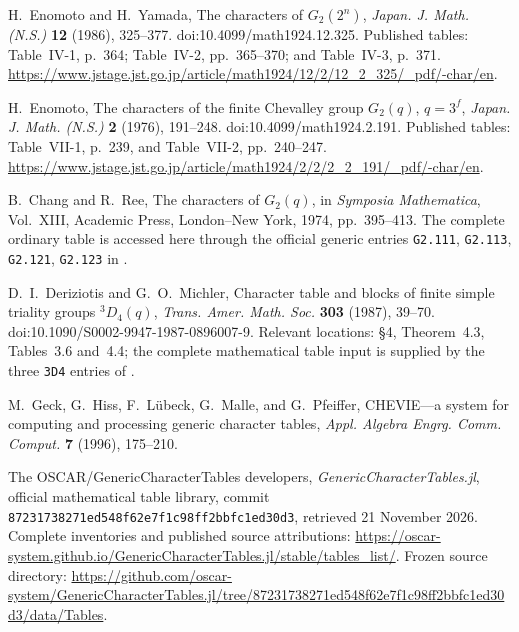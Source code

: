 H.~Enomoto and H.~Yamada,
The characters of $G_2(2^n)$,
\emph{Japan. J. Math. (N.S.)} \textbf{12} (1986), 325--377.
doi:10.4099/math1924.12.325.
Published tables: Table~IV-1, p.~364; Table~IV-2, pp.~365--370;
and Table~IV-3, p.~371.
\url{https://www.jstage.jst.go.jp/article/math1924/12/2/12_2_325/_pdf/-char/en}.

H.~Enomoto,
The characters of the finite Chevalley group $G_2(q)$, $q=3^f$,
\emph{Japan. J. Math. (N.S.)} \textbf{2} (1976), 191--248.
doi:10.4099/math1924.2.191.
Published tables: Table~VII-1, p.~239, and Table~VII-2, pp.~240--247.
\url{https://www.jstage.jst.go.jp/article/math1924/2/2/2_2_191/_pdf/-char/en}.

B.~Chang and R.~Ree,
The characters of $G_2(q)$,
in \emph{Symposia Mathematica}, Vol.~XIII,
Academic Press, London--New York, 1974, pp.~395--413.
The complete ordinary table is accessed here through the official
generic entries \texttt{G2.111}, \texttt{G2.113},
\texttt{G2.121}, \texttt{G2.123} in \cite{G2T:GCT}.

D.~I.~Deriziotis and G.~O.~Michler,
Character table and blocks of finite simple triality groups ${}^3D_4(q)$,
\emph{Trans. Amer. Math. Soc.} \textbf{303} (1987), 39--70.
doi:10.1090/S0002-9947-1987-0896007-9.
Relevant locations: \S4, Theorem~4.3, Tables~3.6 and~4.4;
the complete mathematical table input is supplied by the three
\texttt{3D4} entries of \cite{G2T:GCT}.

M.~Geck, G.~Hiss, F.~L\"ubeck, G.~Malle, and G.~Pfeiffer,
CHEVIE---a system for computing and processing generic character tables,
\emph{Appl. Algebra Engrg. Comm. Comput.} \textbf{7} (1996), 175--210.

The OSCAR/GenericCharacterTables developers,
\emph{GenericCharacterTables.jl}, official mathematical table library,
commit \texttt{87231738271ed548f62e7f1c98ff2bbfc1ed30d3},
retrieved 21 November 2026.
Complete inventories and published source attributions:
\url{https://oscar-system.github.io/GenericCharacterTables.jl/stable/tables_list/}.
Frozen source directory:
\url{https://github.com/oscar-system/GenericCharacterTables.jl/tree/87231738271ed548f62e7f1c98ff2bbfc1ed30d3/data/Tables}.

